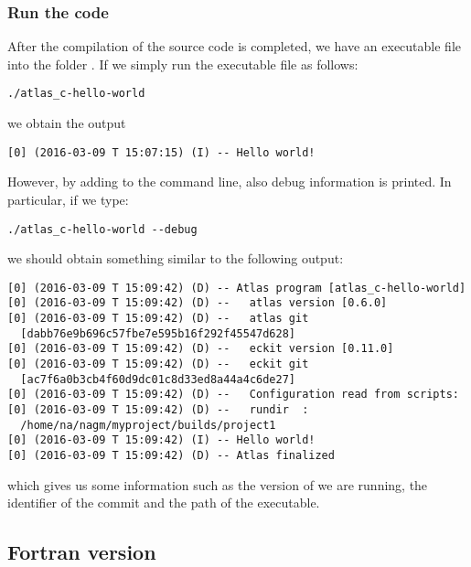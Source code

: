\subsubsection*{Run the code}
After the compilation of the source code is completed, 
we have an executable file into the folder .
If we simply run the executable file as follows:
%
\begin{lstlisting}[style=BashStyle]
./atlas_c-hello-world
\end{lstlisting}
% 
we obtain the output
\begin{lstlisting}[style=BashStyle]
[0] (2016-03-09 T 15:07:15) (I) -- Hello world!
\end{lstlisting}
%
However, by adding  to the command line,
also debug information is printed.
In particular, if we type:
%
\begin{lstlisting}[style=BashStyle]
./atlas_c-hello-world --debug
\end{lstlisting}
%
we should obtain something similar to the following output:
%
\begin{lstlisting}[style=BashStyle]
[0] (2016-03-09 T 15:09:42) (D) -- Atlas program [atlas_c-hello-world]
[0] (2016-03-09 T 15:09:42) (D) --   atlas version [0.6.0]
[0] (2016-03-09 T 15:09:42) (D) --   atlas git     
  [dabb76e9b696c57fbe7e595b16f292f45547d628]
[0] (2016-03-09 T 15:09:42) (D) --   eckit version [0.11.0]
[0] (2016-03-09 T 15:09:42) (D) --   eckit git     
  [ac7f6a0b3cb4f60d9dc01c8d33ed8a44a4c6de27]
[0] (2016-03-09 T 15:09:42) (D) --   Configuration read from scripts:
[0] (2016-03-09 T 15:09:42) (D) --   rundir  : 
  /home/na/nagm/myproject/builds/project1
[0] (2016-03-09 T 15:09:42) (I) -- Hello world!
[0] (2016-03-09 T 15:09:42) (D) -- Atlas finalized
\end{lstlisting}
%
which gives us some information such as the version of \Atlas we are 
running, the identifier of the commit and the path of the executable. 



\subsection{Fortran version}
\label{s:atlas-hello-world-F}

